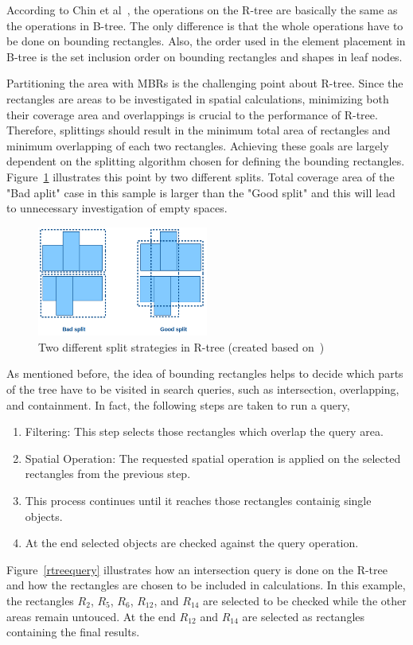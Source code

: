 \documentclass[a4paper,12pt]{article}
\begin{document}
According to Chin et al~\cite{survey}, the operations on the R-tree 
are basically the same as the operations in B-tree. The only difference is that the 
whole operations have to be done on bounding rectangles.
Also, the order used in the element placement in B-tree
is the set inclusion order on bounding rectangles and shapes in leaf nodes. 

Partitioning the area with MBRs is the challenging point about R-tree. 
Since the rectangles are areas to be investigated in spatial calculations, minimizing both their coverage area and overlappings is crucial to the performance of R-tree. Therefore, splittings should result in the minimum total area of rectangles and minimum overlapping of each two rectangles. 
Achieving these goals are largely dependent on the splitting algorithm chosen for defining the bounding rectangles. Figure~\ref{rtreesplit} illustrates this point by two different splits. Total coverage area of the "Bad aplit" case in this sample is larger than the "Good split" and this will lead to unnecessary investigation of empty spaces.

\begin{figure}
\centering
\includegraphics[width=0.5\textwidth,height=0.17\textheight]{R-treeMBR}
\caption{Two different split strategies in R-tree (created based on~\cite{rtree})}
\label{rtreesplit}
\end{figure}

As mentioned before, the idea of bounding rectangles helps to decide which parts of the tree have to be visited in search queries, such as intersection, overlapping, and containment. In fact, the following steps are taken to run a query,
\begin{enumerate}
\item Filtering: This step selects those rectangles which overlap the query area.
\item Spatial Operation: The requested spatial operation is applied on the selected rectangles from the previous step. 
\item This process continues until it reaches those rectangles containig single objects. 
\item At the end selected objects are checked against the query operation. 
\end{enumerate}
Figure~\ref{rtreequery} illustrates how an intersection query is done on the R-tree and how the rectangles are chosen to be included in calculations. In this example, the rectangles $R_2$, $R_5$, $R_6$, $R_{12}$, and $R_{14}$ are selected to be checked while the other areas remain untouced. At the end $R_{12}$ and $R_{14}$ are selected as rectangles containing the final results.
\end{document}
